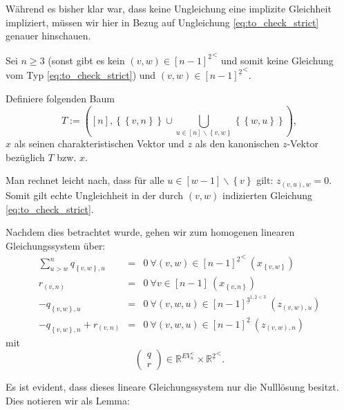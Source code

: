 \documentclass[10p,a4paper,BCOR = 12mm, DIV=15]{scrbook}
\begin{document}
{Während es bisher klar war, dass keine Ungleichung eine implizite Gleichheit impliziert, müssen wir hier in Bezug auf Ungleichung \eqref{eq:to_check_strict} genauer hinschauen.

Sei $n \geq 3$ (sonst gibt es kein $\left(v, w\right)\in {[n-1]^{\underline{2}}}^<$ und somit keine Gleichung vom Typ \eqref{eq:to_check_strict}) und $\left(v, w\right)\in {[n-1]^{\underline{2}}}^<$.

Definiere folgenden Baum
\begin{displaymath}
T := \left(\left[n\right], \left\{ \left\{v, n\right\} \right\} \cup \bigcup_{u \in \left[n\right] \backslash \left\{v, w\right\}} \left\{\left\{w, u\right\}\right\} \right),
\end{displaymath}
$x$ als seinen charakteristischen Vektor und $z$ als den kanonischen $z$-Vektor bezüglich $T$ bzw. $x$.

Man rechnet leicht nach, dass für alle $u\in[w-1]\backslash\left\{v\right\}$ gilt: $z_{\left(v, u\right), w} = 0$. Somit gilt echte Ungleichheit in der durch $\left(v, w\right)$ indizierten Gleichung \eqref{eq:to_check_strict}.

Nachdem dies betrachtet wurde, gehen wir zum homogenen linearen Gleichungssystem über:
\begin{eqnarray*}
\sum_{u > w}^n q_{\left\{v, w\right\}, u} & = & 0\ \forall \left(v, w\right)\in {[n-1]^{\underline{2}}}^<\ \left(x_{\left\{v, w\right\}}\right) \\
r_{\left(v, n\right)} & = & 0\ \forall v \in [n-1]\ \left(x_{\left\{v, n\right\}}\right) \\
-q_{\left\{v, w\right\}, u} & = & 0\ \forall \left(v, w, u\right)\in [n-1]^{\underline{3}^{1,2<3}} \ \left(z_{\left(v, w\right), u}\right) \\
-q_{\left\{v, w\right\}, n} + r_{\left(v, n\right)} & = & 0\ \forall \left(v, w, u\right)\in [n-1]^{\underline{2}} \ \left(z_{\left(v, w\right), n}\right)
\end{eqnarray*}
mit
\begin{displaymath}
\left(\begin{array}{c}
q \\
r
\end{array}\right) \in 
\mathbb{R}^{EV_n^{<}}\times {\mathbb{R}^{\underline{2}}}^<.
\end{displaymath}

Es ist evident, dass dieses lineare Gleichungssystem nur die Nulllösung besitzt. Dies notieren wir als Lemma:

}
\end{document}
